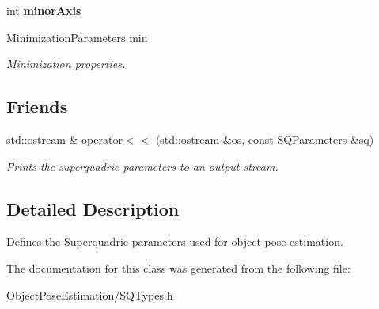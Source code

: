 \begin{DoxyCompactItemize}
\item 
\hypertarget{classope_1_1_s_q_parameters_a96fc6a61b8cbda0c392b545e9e2ea212}{int {\bfseries minor\-Axis}}\label{classope_1_1_s_q_parameters_a96fc6a61b8cbda0c392b545e9e2ea212}

\item 
\hypertarget{classope_1_1_s_q_parameters_ac3e7b2f9a2594ff91bbbd5fbce9be049}{\hyperlink{structope_1_1_minimization_parameters}{Minimization\-Parameters} \hyperlink{classope_1_1_s_q_parameters_ac3e7b2f9a2594ff91bbbd5fbce9be049}{min}}\label{classope_1_1_s_q_parameters_ac3e7b2f9a2594ff91bbbd5fbce9be049}

\begin{DoxyCompactList}\small\item\em Minimization properties. \end{DoxyCompactList}\end{DoxyCompactItemize}
\subsection*{Friends}
\begin{DoxyCompactItemize}
\item 
\hypertarget{classope_1_1_s_q_parameters_adba751c41d4e085944e80f7ad257a663}{std\-::ostream \& \hyperlink{classope_1_1_s_q_parameters_adba751c41d4e085944e80f7ad257a663}{operator$<$$<$} (std\-::ostream \&os, const \hyperlink{classope_1_1_s_q_parameters}{S\-Q\-Parameters} \&sq)}\label{classope_1_1_s_q_parameters_adba751c41d4e085944e80f7ad257a663}

\begin{DoxyCompactList}\small\item\em Prints the superquadric parameters to an output stream. \end{DoxyCompactList}\end{DoxyCompactItemize}


\subsection{Detailed Description}
Defines the Superquadric parameters used for object pose estimation. 

The documentation for this class was generated from the following file\-:\begin{DoxyCompactItemize}
\item 
Object\-Pose\-Estimation/S\-Q\-Types.\-h\end{DoxyCompactItemize}
